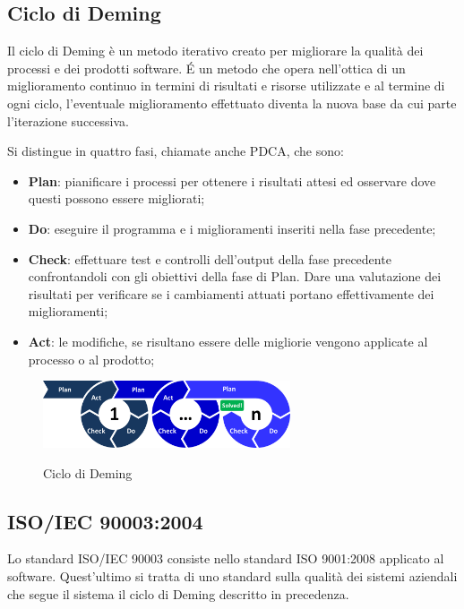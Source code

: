 	\subsection{Ciclo di Deming}
	Il ciclo di Deming è un metodo iterativo creato per migliorare la qualità dei processi e dei prodotti software. \'E un metodo che opera nell'ottica di un miglioramento continuo in termini di risultati e risorse utilizzate e al termine di ogni ciclo, l'eventuale miglioramento effettuato diventa la nuova base da cui parte l'iterazione successiva.
	
	Si distingue in quattro fasi, chiamate anche PDCA, che sono:
	
	\begin{itemize}
		\item \textbf{Plan}: pianificare i processi per ottenere i risultati attesi ed osservare dove questi possono essere migliorati;
		\item \textbf{Do}: eseguire il programma e i miglioramenti inseriti nella fase precedente;
		\item \textbf{Check}: effettuare test e controlli dell'output della fase precedente confrontandoli con gli obiettivi della fase di Plan. Dare una valutazione dei risultati per verificare se i cambiamenti attuati portano effettivamente dei miglioramenti;
		\item \textbf{Act}: le modifiche, se risultano essere delle migliorie vengono applicate al processo o al prodotto;
	\end{itemize}

	\begin{figure}[H]
		\centering
		\includegraphics[width=0.65\textwidth]{img/PDCA}
		\label{fig:PDCA}
		\caption[Ciclo di Deming]{Ciclo di Deming\protect\footnotemark}
	\end{figure}


	\subsection{ISO/IEC 90003:2004}
	Lo standard ISO/IEC 90003 consiste nello standard ISO 9001:2008 applicato al software. Quest'ultimo si tratta di uno standard sulla qualità dei sistemi aziendali che segue il sistema il ciclo di Deming descritto in precedenza.
	
